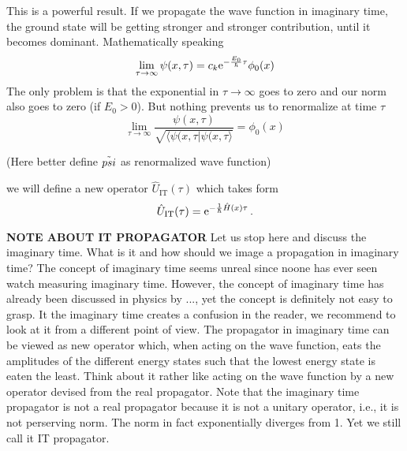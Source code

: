 This is a powerful result. If we propagate the wave function in imaginary time, the ground state will be getting stronger and stronger contribution, until it becomes dominant. Mathematically speaking
\begin{equation}
    \lim_{\tau\to\infty} \psi(x,\tau) = c_k  \mathrm{e}^{-\frac{E_0}{\hbar}\tau} \phi_0(x)
\end{equation}
The only problem is that the exponential in $\tau\to\infty$ goes to zero and our norm also goes to zero (if $E_0 > 0$). But nothing prevents us to renormalize at time $\tau$
\begin{equation}
    \lim_{\tau\to\infty} \frac{\psi(x,\tau)}{\sqrt{\langle\psi(x,\tau | \psi(x,\tau \rangle}} = \phi_0(x)
\end{equation}

(Here better define $\Tilde{psi}$ as renormalized wave function)

\vspace{2cm}
we will define a new operator $\hat{U}_\mathrm{IT}(\tau)$ which takes form
\begin{equation}
    \hat{U}_\mathrm{IT}(\tau) = \mathrm{e}^{-\frac{1}{\hbar}\hat{H}(x)\tau} \, .
\end{equation}


\textbf{NOTE ABOUT IT PROPAGATOR}
Let us stop here and discuss the imaginary time. What is it and how should we image a propagation in imaginary time? The concept of imaginary time seems unreal since noone has ever seen watch measuring imaginary time. However, the concept of imaginary time has already been discussed in physics by ..., yet the concept is definitely not easy to grasp. It the imaginary time creates a confusion in the reader, we recommend to look at it from a different point of view. The propagator in imaginary time can be viewed as new operator which, when acting on the wave function, eats the amplitudes of the different energy states such that the lowest energy state is eaten the least. Think about it rather like acting on the wave function by a new operator devised from the real propagator. Note that the imaginary time propagator is not a real propagator because it is not a unitary operator, i.e., it is not perserving norm. The norm in fact exponentially diverges from 1. Yet we still call it IT propagator.